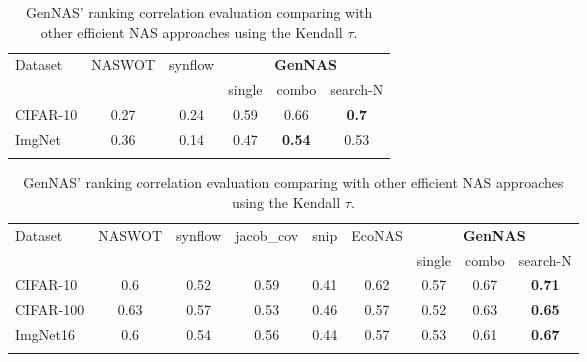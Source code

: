 \documentclass{article}
\begin{document}
\begin{table}[!h]
\vspace{-8pt}
\scriptsize
  \caption{GenNAS' ranking correlation evaluation comparing with other efficient NAS approaches using the Kendall $\tau$.}
  \label{table:GenNAS_rankingcorrelation_tau}
  \centering
\setlength{\tabcolsep}{3pt}

\begin{tabular}{lccccc}
\Xhline{0.8pt}
\multicolumn{6}{l}{\textbf{NASBench-101}} \\ \hline
Dataset & NASWOT & synflow &  \multicolumn{3}{c}{\textbf{GenNAS}} \\\cline{4-6}
     & ~\cite{mellor2020neural} & ~\cite{abdelfattah2021zero} & single & combo & search-N \\\hline
CIFAR-10 & 0.27&	0.24&	0.59&	0.66	& \textbf{0.7}\\
ImgNet & 0.36&	0.14&	0.47&	\textbf{0.54}&	0.53 \\
\Xhline{0.8pt}
\vspace{-8pt}
\end{tabular}

\begin{tabular}{lccccc|ccc}
\Xhline{0.8pt}
\multicolumn{6}{l}{\textbf{NASBench-201}} \\ \hline
Dataset & NASWOT & synflow &jacob\_cov & snip  & EcoNAS & \multicolumn{3}{c}{\textbf{GenNAS}} \\\cline{7-9}
&&& &  &\cite{zhou2020econas}  & single & combo & search-N \\\hline
CIFAR-10 &  0.6&0.52&0.59&0.41&0.62&0.57&	0.67	&\textbf{0.71} \\
CIFAR-100 & 0.63	&0.57&	0.53&	0.46&	0.57&	0.52&	0.63	&\textbf{0.65} \\
ImgNet16 & 0.6&	0.54&	0.56&	0.44&	0.57&	0.53&	0.61	&\textbf{0.67} \\
\Xhline{0.8pt}
\end{tabular}


\end{table}
\end{document}
